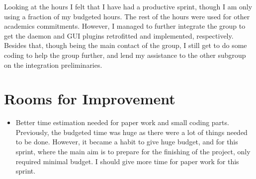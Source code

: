Looking at the hours I felt that I have had a productive sprint, though I am only using a fraction of my budgeted hours. The rest of the hours were used for other academics commitments. However, I managed to further integrate the group to get the daemon and GUI plugins retrofitted and implemented, respectively. Besides that, though being the main contact of the group, I still get to do some coding to help the group further, and lend my assistance to the other subgroup on the integration preliminaries. 

\section*{Rooms for Improvement}

\begin{itemize}
   \item Better time estimation needed for paper work and small coding parts. Previously, the budgeted time was huge as there were a lot of things needed to be done. However, it became a habit to give huge budget, and for this sprint, where the main aim is to prepare for the finishing of the project, only required minimal budget. I should give more time for paper work for this sprint. 
\end{itemize}
